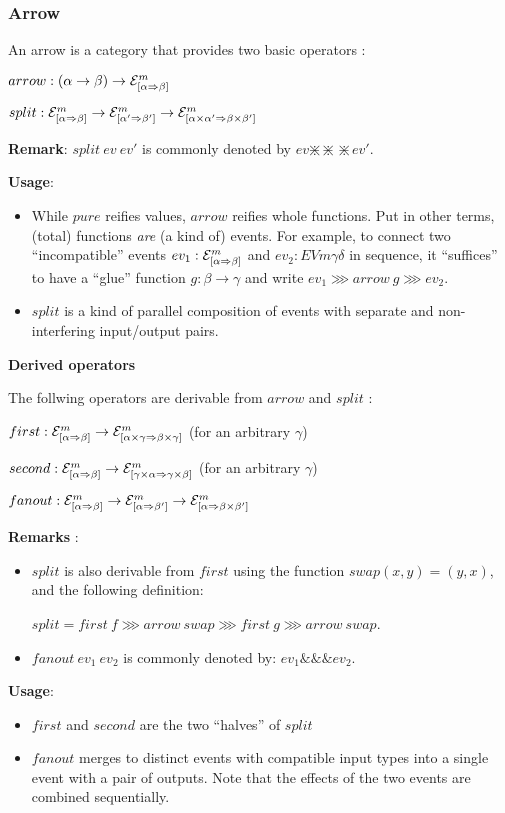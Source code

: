 \documentclass{article}
\newcommand{\EV}[3]{\ensuremath{{\cal{E}}^{#1}_{[#2 \Rightarrow #3]}}}
\newcommand{\SEQ}{\ggg} %
\newcommand{\SPLIT}{\mathbin{\divideontimes\!\!\!\!\divideontimes\!\!\!\!\divideontimes}}
\newcommand{\FANOUT}{\mathbin{\&\!\!\!\&\!\!\!\&}}
\begin{document}
\subsubsection{Arrow}

An arrow is a category that provides two basic operators :

$arrow : (\alpha \rightarrow \beta) \rightarrow \EV{m}{\alpha}{\beta}$

$split : \EV{m}{\alpha}{\beta} \rightarrow \EV{m}{\alpha'}{\beta'} \rightarrow \EV{m}{\alpha \times \alpha'}{\beta \times \beta'}$

\textbf{Remark}: $split~ev~ev'$ is commonly denoted by $ev \SPLIT ev'$.

\textbf{Usage}:
\begin{itemize}
\item While $pure$ reifies values, $arrow$ reifies whole functions. Put in other terms, (total) functions \emph{are} (a kind of) events. For example, to connect two ``incompatible'' events $ev_1 : \EV{m}{\alpha}{\beta}$ and $ev_2 : EV{m}{\gamma}{\delta}$ in sequence, it ``suffices'' to have a ``glue'' function $g : \beta \rightarrow \gamma$ and write $ev_1 \SEQ arrow~g \SEQ ev_2$.
\item $split$ is a kind of parallel composition of events with separate and non-interfering input/output pairs.
\end{itemize}

\textbf{Derived operators}

The follwing operators are derivable from $arrow$ and $split$ :

$first : \EV{m}{\alpha}{\beta} \rightarrow \EV{m}{\alpha \times \gamma}{\beta \times \gamma}$ (for an arbitrary $\gamma$)

$second : \EV{m}{\alpha}{\beta} \rightarrow \EV{m}{\gamma \times \alpha}{\gamma \times \beta}$ (for an arbitrary $\gamma$)

$fanout : \EV{m}{\alpha}{\beta} \rightarrow \EV{m}{\alpha}{\beta'} \rightarrow \EV{m}{\alpha}{\beta \times \beta'}$

\textbf{Remarks} : 
\begin{itemize}
\item $split$ is also derivable from $first$ using the function $swap (x, y) = (y, x)$, and the following definition: 

$split = first~f \SEQ arrow~swap \SEQ first~g \SEQ arrow~swap$.
\item $fanout~ev_1~ev_2$ is commonly denoted by: $ev_1 \FANOUT ev_2$.
\end{itemize}

\textbf{Usage}:
\begin{itemize}
\item $first$ and $second$ are the two ``halves'' of $split$ 
\item $fanout$ merges to distinct events with compatible input types into a single event with a pair of outputs. Note that the effects of the two events are combined sequentially.
\end{itemize}
\end{document}
